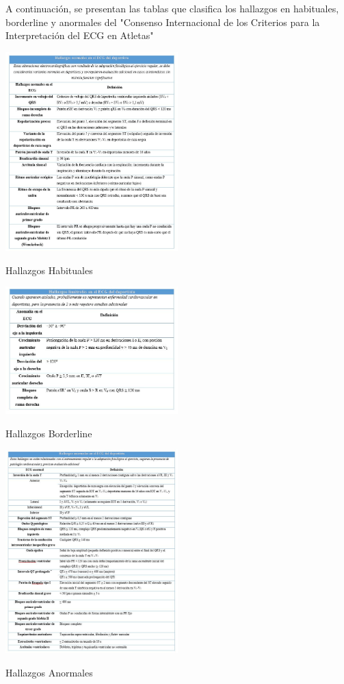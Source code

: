 \documentclass[conference]{IEEEtran}
\begin{document}
A continuación, se presentan las tablas que clasifica los hallazgos en habituales, borderline y anormales del 
"Consenso Internacional de los Criterios para la Interpretación del ECG en Atletas"

\begin{table}[H]
    \includegraphics[width=0.5\textwidth]{./graficos/Tabla1HallazgosHabituales.jpg}
    \caption{Hallazgos Habituales}
\end{table}

\begin{table}[H]
    \includegraphics[width=0.5\textwidth]{./graficos/Tabla2HallazgosBorderline.jpg}
    \caption{Hallazgos Borderline}
\end{table}

\begin{table}[H]
    \includegraphics[width=0.5\textwidth]{./graficos/Tabla3HallazgosAnormales.jpg}
    \caption{Hallazgos Anormales}
\end{table}
\end{document}
